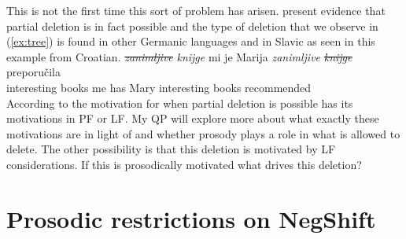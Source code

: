 \documentclass[12pt, letterpaper]{article}
\begin{document}
This is not the first time this sort of problem has arisen. \citet{fanselowRemarksEconomyPronunciation2001,fanselowDistributedDeletion2002} present evidence that partial deletion is in fact possible and the type of deletion that we observe in (\ref{ex:tree}) is found in other Germanic languages and in Slavic as seen in this example from Croatian.
\ea 
\gll \emph{\sout{zanimljive}} \emph{knijge} mi je Marija \emph{zanimljive} \emph{\sout{knijge}} preporučila\\
interesting books me has Mary interesting books recommended\\
\z  
According to \citet{fanselowRemarksEconomyPronunciation2001,fanselowDistributedDeletion2002} the motivation for when partial deletion is possible has its motivations in PF or LF. My QP will explore more about what exactly these motivations are in light of \citeauthor{fanselowRemarksEconomyPronunciation2001,fanselowDistributedDeletion2002} and whether prosody plays a role in what is allowed to delete. The other possibility is that this deletion is motivated by LF considerations. If this is prosodically motivated what drives this deletion?

\section{Prosodic restrictions on NegShift} \label{sec:PROSODY}
\end{document}
